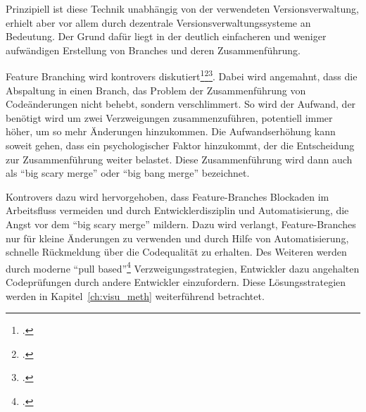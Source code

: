 Prinzipiell ist diese Technik unabhängig von der verwendeten Versionsverwaltung, erhielt aber vor allem durch dezentrale 
Versionsverwaltungssysteme an Bedeutung. Der Grund dafür liegt in der deutlich einfacheren und weniger aufwändigen 
Erstellung von Branches und deren Zusammenführung.

Feature Branching wird kontrovers diskutiert\footcite[vgl.][]{fowler-feature-branch}\footcite[vgl.][]{ci-is-dead}\footcite[vgl.][]{fb-revisited}. 
Dabei wird angemahnt, dass die Abspaltung in einen Branch, das Problem der Zusammenführung von Codeänderungen nicht 
behebt, sondern verschlimmert. So wird der Aufwand, der benötigt wird um zwei Verzweigungen zusammenzuführen, potentiell 
immer höher, um so mehr Änderungen hinzukommen. Die Aufwandserhöhung kann soweit gehen, dass ein psychologischer Faktor 
hinzukommt, der die Entscheidung zur Zusammenführung weiter belastet. Diese Zusammenführung wird dann auch als ``big 
scary merge'' oder ``big bang merge'' bezeichnet.

Kontrovers dazu wird hervorgehoben, dass Feature-Branches Blockaden im Arbeitsfluss vermeiden und durch Entwicklerdisziplin und Automatisierung, die Angst vor dem ``big scary merge'' mildern. Dazu wird verlangt, Feature-Branches nur für kleine Änderungen zu verwenden und durch Hilfe von Automatisierung, schnelle Rückmeldung über die Codequalität zu erhalten. Des Weiteren werden durch moderne ``pull based''\footcite[vgl.][]{github-about-pull} Verzweigungsstrategien, Entwickler dazu angehalten Codeprüfungen durch andere Entwickler einzufordern. Diese 
Lösungsstrategien werden in Kapitel~\ref{ch:visu_meth} weiterführend betrachtet.
